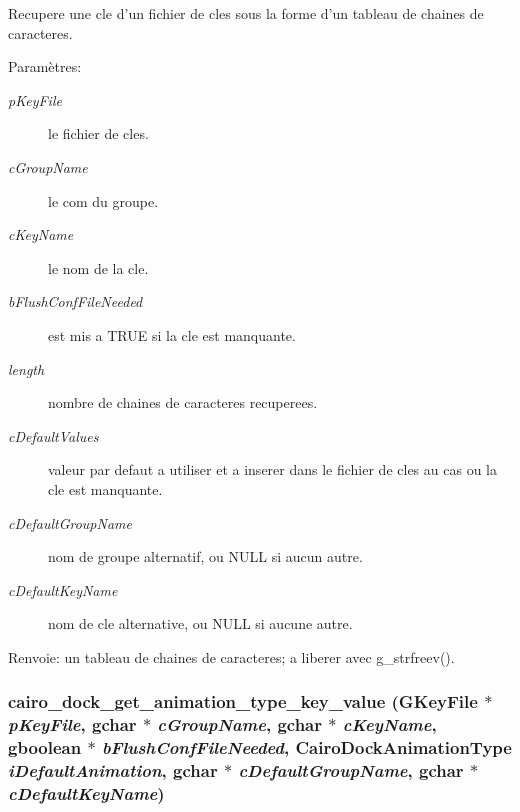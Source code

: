 Recupere une cle d'un fichier de cles sous la forme d'un tableau de chaines de caracteres. \begin{Desc}
\item[Paramètres:]
\begin{description}
\item[{\em pKeyFile}]le fichier de cles. \item[{\em cGroupName}]le com du groupe. \item[{\em cKeyName}]le nom de la cle. \item[{\em bFlushConfFileNeeded}]est mis a TRUE si la cle est manquante. \item[{\em length}]nombre de chaines de caracteres recuperees. \item[{\em cDefaultValues}]valeur par defaut a utiliser et a inserer dans le fichier de cles au cas ou la cle est manquante. \item[{\em cDefaultGroupName}]nom de groupe alternatif, ou NULL si aucun autre. \item[{\em cDefaultKeyName}]nom de cle alternative, ou NULL si aucune autre. \end{description}
\end{Desc}
\begin{Desc}
\item[Renvoie:]un tableau de chaines de caracteres; a liberer avec g\_\-strfreev(). \end{Desc}
\subsubsection{ cairo\_\-dock\_\-get\_\-animation\_\-type\_\-key\_\-value (GKeyFile $\ast$ {\em pKeyFile}, gchar $\ast$ {\em cGroupName}, gchar $\ast$ {\em cKeyName}, gboolean $\ast$ {\em bFlushConfFileNeeded}, {\bf CairoDockAnimationType} {\em iDefaultAnimation}, gchar $\ast$ {\em cDefaultGroupName}, gchar $\ast$ {\em cDefaultKeyName})}\label{cairo-dock-config_8h_0f38d81a9b3b79fa90c5c5a87fd38f95}


